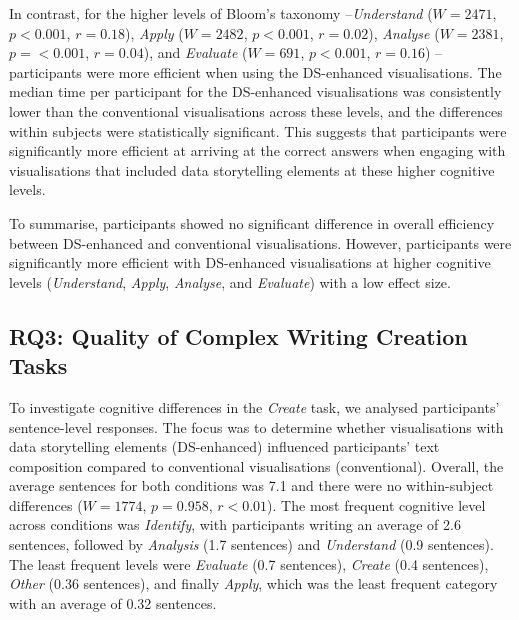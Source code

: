 In contrast, for the higher levels of Bloom's taxonomy --\textit{Understand} ($W=2471$, $p<0.001$, $r=0.18$), \textit{Apply} ($W=2482$, $p<0.001$, $r=0.02$), \textit{Analyse} ($W=2381$, $p=<0.001$, $r=0.04$), and \textit{Evaluate} ($W=691$, $p<0.001$, $r=0.16$) -- participants were more efficient when using the DS-enhanced visualisations. The median time per participant for the DS-enhanced visualisations was consistently lower than the conventional visualisations across these levels, and the differences within subjects were statistically significant. This suggests that participants were significantly more efficient at arriving at the correct answers when engaging with visualisations that included data storytelling elements at these higher cognitive levels.

To summarise, participants showed no significant difference in overall efficiency between DS-enhanced and conventional visualisations. However, participants were significantly more efficient with DS-enhanced visualisations at higher cognitive levels (\textit{Understand}, \textit{Apply}, \textit{Analyse}, and \textit{Evaluate}) with a low effect size.

\subsection{RQ3: Quality of Complex Writing Creation Tasks}
To investigate cognitive differences in the \textit{Create} task, we analysed participants' sentence-level responses. The focus was to determine whether visualisations with data storytelling elements (DS-enhanced) influenced participants' text composition compared to conventional visualisations (conventional). Overall, the average sentences for both conditions was 7.1 and there were no within-subject differences ($W = 1774$, $p = 0.958$, $r<0.01$). The most frequent cognitive level across conditions was \textit{Identify}, with participants writing an average of 2.6 sentences, followed by \textit{Analysis} (1.7 sentences) and \textit{Understand} (0.9 sentences). The least frequent levels were \textit{Evaluate} (0.7 sentences), \textit{Create} (0.4 sentences), \textit{Other} (0.36 sentences), and finally \textit{Apply}, which was the least frequent category with an average of 0.32 sentences.

